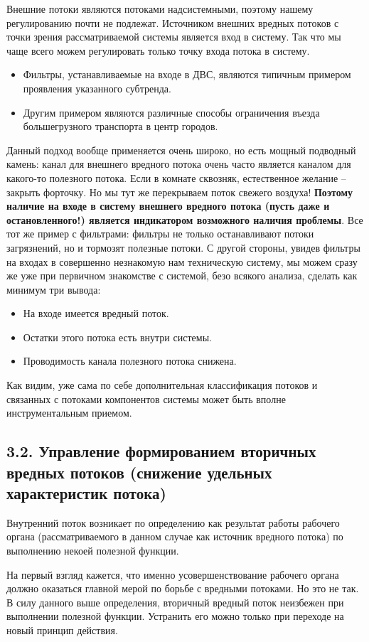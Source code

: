 \documentclass[a4paper,11pt]{article}
\begin{document}
Внешние потоки являются потоками надсистемными, поэтому нашему регулированию
почти не подлежат. Источником внешних вредных потоков с точки зрения
рассматриваемой системы является вход в систему. Так что мы чаще всего можем
регулировать только точку входа потока в систему.
\begin{itemize}
\item Фильтры, устанавливаемые на входе в ДВС, являются типичным примером
  проявления указанного субтренда.
\item Другим примером являются различные способы ограничения въезда
  большегрузного транспорта в центр городов.
\end{itemize}
Данный подход вообще применяется очень широко, но есть мощный подводный
камень: канал для внешнего вредного потока очень часто является каналом для
какого-то полезного потока. Если в комнате сквозняк, естественное желание --
закрыть форточку. Но мы тут же перекрываем поток свежего воздуха!
\textbf{Поэтому наличие на входе в систему внешнего вредного потока (пусть
  даже и остановленного!) является индикатором возможного наличия
  проблемы}. Все тот же пример с фильтрами: фильтры не только останавливают
потоки загрязнений, но и тормозят полезные потоки. С другой стороны, увидев
фильтры на входах в совершенно незнакомую нам техническую систему, мы можем
сразу же уже при первичном знакомстве с системой, безо всякого анализа,
сделать как минимум три вывода:
\begin{itemize}
\item На входе имеется вредный поток.
\item Остатки этого потока есть внутри системы.
\item Проводимость канала полезного потока снижена.
\end{itemize}
Как видим, уже сама по себе дополнительная классификация потоков и связанных с
потоками компонентов системы может быть вполне инструментальным приемом.

\subsection{3.2. Управление формированием вторичных вредных потоков (снижение
  удельных характеристик потока)}

Внутренний поток возникает по определению как результат работы рабочего органа
(рассматриваемого в данном случае как источник вредного потока) по выполнению
некоей полезной функции.

На первый взгляд кажется, что именно усовершенствование рабочего органа должно
оказаться главной мерой по борьбе с вредными потоками. Но это не так. В силу
данного выше определения, вторичный вредный поток неизбежен при выполнении
полезной функции. Устранить его можно только при переходе на новый принцип
действия.
\end{document}
